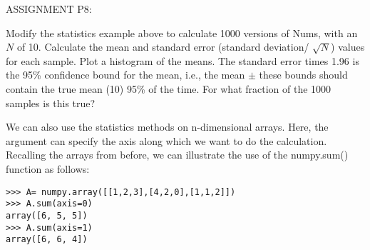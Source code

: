 {{\color{red} \singlespacing

ASSIGNMENT P8:

Modify the statistics example above to calculate 1000 versions of Nums, with an $N$ of 10.  Calculate the mean and standard error (standard deviation/ $\sqrt N$) values for each sample.  Plot a histogram of the means.   
The  standard error times 1.96 is the 95\% confidence bound for the mean, i.e., the mean $\pm$ these bounds should contain the true mean (10) 95\% of the time.  For what  fraction of the 1000 samples is this true? 
}

We can also use the statistics methods on n-dimensional arrays.  Here, the argument can specify the axis along which we want to do the calculation.   Recalling the arrays from before, we can illustrate the use of the {\color{blue}numpy.sum()} function as follows:

{\color{blue}\begin{verbatim}
>>> A= numpy.array([[1,2,3],[4,2,0],[1,1,2]])
>>> A.sum(axis=0)
array([6, 5, 5])
>>> A.sum(axis=1)
array([6, 6, 4])
\end{verbatim}}




%



%


}
